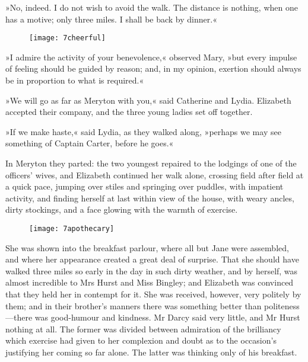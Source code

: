 »No, indeed. I do not wish to avoid the walk. The distance is nothing, when one has a motive; only three miles. I shall be back by dinner.«

\begin{figure}[tbh]
\centering
\texttt{[image: 7cheerful]}
\end{figure}

»I admire the activity of your benevolence,« observed Mary, »but every impulse of feeling should be guided by reason; and, in my opinion, exertion should always be in proportion to what is required.«

»We will go as far as Meryton with you,« said Catherine and Lydia. Elizabeth accepted their company, and the three young ladies set off together.




»If we make haste,« said Lydia, as they walked along, »perhaps we may see something of Captain Carter, before he goes.«

In Meryton they parted: the two youngest repaired to the lodgings of one of the officers' wives, and Elizabeth continued her walk alone, crossing field after field at a quick pace, jumping over stiles and springing over puddles, with impatient activity, and finding herself at last within view of the house, with weary ancles, dirty stockings, and a face glowing with the warmth of exercise.

	\begin{figure}[bh]
\centering
\texttt{[image: 7apothecary]}
\end{figure}

She was shown into the breakfast parlour, where all but Jane were assembled, and where her appearance created a great deal of surprise. That she should have walked three miles so early in the day in such dirty weather, and by herself, was almost incredible to Mrs Hurst and Miss Bingley; and Elizabeth was convinced that they held her in contempt for it. She was received, however, very politely by them; and in their brother's manners there was something better than politeness—there was good-humour and kindness. Mr Darcy said very little, and Mr Hurst nothing at all. The former was divided between admiration of the brilliancy which exercise had given to her complexion and doubt as to the occasion's justifying her coming so far alone. The latter was thinking only of his breakfast.

